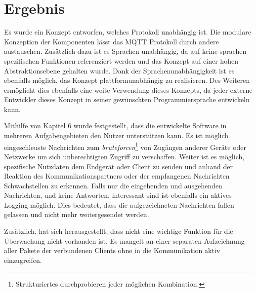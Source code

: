 \chapter{Ergebnis}

Es wurde ein Konzept entworfen, welches Protokoll unabhängig ist. Die modulare Konzeption der Komponenten lässt das \ac{MQTT} Protokoll durch andere austauschen. Zusätzlich dazu ist es Sprachen unabhängig, da auf keine sprachen spezifischen Funktionen referenziert werden und das Konzept auf einer hohen Abstraktionsebene gehalten wurde. Dank der Sprachenunabhängigkeit ist es ebenfalls möglich, das Konzept plattformunabhängig zu realisieren. Des Weiteren ermöglicht dies ebenfalls eine weite Verwendung dieses Konzepts, da jeder externe Entwickler dieses Konzept in seiner gewünschten Programmiersprache entwickeln kann.

Mithilfe von Kapitel 6 wurde festgestellt, dass die entwickelte Software in mehreren Aufgabengebieten den Nutzer unterstützen kann.
Es ist möglich eingeschleuste Nachrichten zum \emph{bruteforcen}\footnote{Strukturiertes durchprobieren jeder möglichen Kombination.} von Zugängen anderer Geräte oder Netzwerke um sich unberechtigten Zugriff zu verschaffen.
Weiter ist es möglich, spezifische Nutzdaten dem Endgerät oder Client zu senden und anhand der Reaktion des Kommunikationspartners oder der empfangenen Nachrichten Schwachstellen zu erkennen.
Falls nur die eingehenden und ausgehenden Nachrichten, und keine Antworten, interessant sind ist ebenfalls ein aktives Logging möglich. Dies bedeutet, dass die aufgezeichneten Nachrichten fallen gelassen und nicht mehr weitergesendet werden.

Zusätzlich, hat sich herausgestellt, dass nicht eine wichtige Funktion für die Überwachung nicht vorhanden ist. Es mangelt an einer separaten Aufzeichnung aller Pakete der verbundenen Clients ohne in die Kommunikation aktiv einzugreifen.
